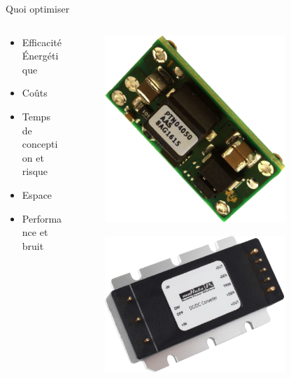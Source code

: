 \begin{frame}{Quoi optimiser}
    \begin{columns}
        \begin{column}{0.5\textwidth}
            \vspace{-48pt}
            \large
            \begin{itemize}
                \item Efficacité Énergétique
                \item Coûts
                \item Temps de conception et risque
                \item Espace
                \item Performance et bruit
            \end{itemize}
        \end{column}
        \begin{column}{0.5\textwidth}
            \begin{figure}
                \includegraphics[width=0.8\textwidth, height=0.33\textheight,
                keepaspectratio]{pictures/ptn0405aas.png}
            \end{figure}
            \vfill
            \begin{figure}
                \includegraphics[width=0.8\textwidth, height=0.33\textheight, keepaspectratio]{pictures/ire-q12.png}

\end{figure}
\end{column}
\end{columns}
\end{frame}
